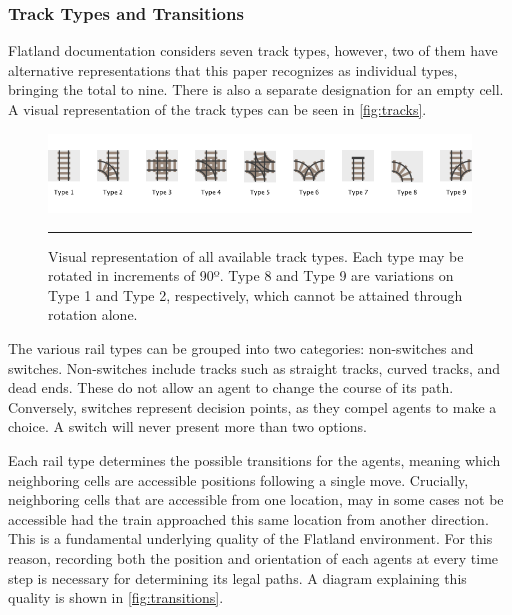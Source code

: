\documentclass[11pt]{article}
\begin{document}
\subsubsection{Track Types and Transitions}
\label{sec:Track}
Flatland documentation considers seven track types, however, two of them have alternative representations that this paper recognizes as individual types, bringing the total to nine.  There is also a separate designation for an empty cell.  A visual representation of the track types can be seen in \autoref{fig:tracks}.

\begin{figure}[t]
\centering
\includegraphics[width=\textwidth]{tracks}
\caption{Visual representation of all available track types.  Each type may be rotated in increments of 90º.  Type 8 and Type 9 are variations on Type 1 and Type 2, respectively, which cannot be attained through rotation alone.}
\label{fig:tracks}

\begin{center}
{\color{lightgray} \rule{\linewidth}{0.15mm}}
\end{center}

\end{figure}

The various rail types can be grouped into two categories: non-switches and switches.  Non-switches include tracks such as straight tracks, curved tracks, and dead ends.  These do not allow an agent to change the course of its path.  Conversely, switches represent decision points, as they compel agents to make a choice.  A switch will never present more than two options.

Each rail type determines the possible transitions for the agents, meaning which neighboring cells are accessible positions following a single move.  Crucially, neighboring cells that are accessible from one location, may in some cases not be accessible had the train approached this same location from another direction.  This is a fundamental underlying quality of the Flatland environment.  For this reason, recording both the position and orientation of each agents at every time step is necessary for determining its legal paths.  A diagram explaining this quality is shown in \autoref{fig:transitions}.
\end{document}
